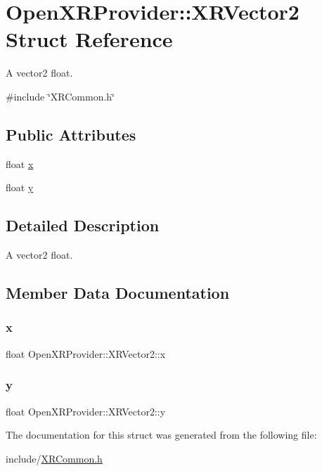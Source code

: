 \hypertarget{struct_open_x_r_provider_1_1_x_r_vector2}{}\section{Open\+X\+R\+Provider\+::X\+R\+Vector2 Struct Reference}
\label{struct_open_x_r_provider_1_1_x_r_vector2}


A vector2 float.  




{\ttfamily \#include \char`\"{}X\+R\+Common.\+h\char`\"{}}

\subsection*{Public Attributes}
\begin{DoxyCompactItemize}
\item 
float \mbox{\hyperlink{struct_open_x_r_provider_1_1_x_r_vector2_a80538197b221eb3fc106dd920617c762}{x}}
\item 
float \mbox{\hyperlink{struct_open_x_r_provider_1_1_x_r_vector2_abdfb93d1187fe492ad6452f66a165c53}{y}}
\end{DoxyCompactItemize}


\subsection{Detailed Description}
A vector2 float. 

\subsection{Member Data Documentation}
\mbox{\label{struct_open_x_r_provider_1_1_x_r_vector2_a80538197b221eb3fc106dd920617c762}} 
\subsubsection{\texorpdfstring{x}{x}}
{\footnotesize\ttfamily float Open\+X\+R\+Provider\+::\+X\+R\+Vector2\+::x}

\mbox{\label{struct_open_x_r_provider_1_1_x_r_vector2_abdfb93d1187fe492ad6452f66a165c53}} 
\subsubsection{\texorpdfstring{y}{y}}
{\footnotesize\ttfamily float Open\+X\+R\+Provider\+::\+X\+R\+Vector2\+::y}



The documentation for this struct was generated from the following file\+:\begin{DoxyCompactItemize}
\item 
include/\mbox{\hyperlink{_x_r_common_8h}{X\+R\+Common.\+h}}\end{DoxyCompactItemize}
